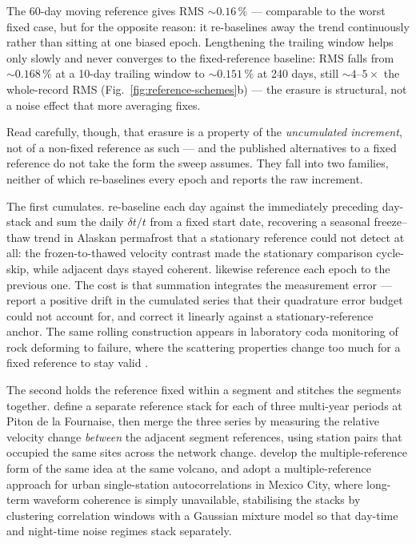 \documentclass[
  referee]{gji}
\begin{document}
The 60-day moving reference gives RMS \(\sim\!0.16\,\%\) --- comparable
to the worst fixed case, but for the opposite reason: it re-baselines
away the trend continuously rather than sitting at one biased epoch.
Lengthening the trailing window helps only slowly and never converges to
the fixed-reference baseline: RMS falls from \(\sim\!0.168\,\%\) at a
10-day trailing window to \(\sim\!0.151\,\%\) at 240 days, still
\(\sim\!4\)--\(5\times\) the whole-record RMS
(Fig.~\ref{fig:reference-schemes}b) --- the erasure is structural, not a
noise effect that more averaging fixes.

Read carefully, though, that erasure is a property of the
\emph{uncumulated
increment}, not of a non-fixed reference as such --- and the published
alternatives to a fixed reference do not take the form the sweep
assumes. They fall into two families, neither of which re-baselines
every epoch and reports the raw increment.

The first cumulates. \citet{James2017} re-baseline each day against the
immediately preceding day-stack and sum the daily \(\delta t/t\) from a
fixed start date, recovering a seasonal freeze--thaw trend in Alaskan
permafrost that a stationary reference could not detect at all: the
frozen-to-thawed velocity contrast made the stationary comparison
cycle-skip, while adjacent days stayed coherent. \citet{Rivet2011}
likewise reference each epoch to the previous one. The cost is that
summation integrates the measurement error --- \citet{James2017} report
a positive drift in the cumulated series that their quadrature error
budget could not account for, and correct it linearly against a
stationary-reference anchor. The same rolling construction appears in
laboratory coda monitoring of rock deforming to failure, where the
scattering properties change too much for a fixed reference to stay
valid \citep{ZotzWilson2019}.

The second holds the reference fixed within a segment and stitches the
segments together. \citet{Rivet2014} define a separate reference stack
for each of three multi-year periods at Piton de la Fournaise, then
merge the three series by measuring the relative velocity change
\emph{between} the adjacent segment references, using station pairs that
occupied the same sites across the network change.
\citet{SensSchonfelder2014} develop the multiple-reference form of the
same idea at the same volcano, and \citet{Ermert2023} adopt a
multiple-reference approach for urban single-station autocorrelations in
Mexico City, where long-term waveform coherence is simply unavailable,
stabilising the stacks by clustering correlation windows with a Gaussian
mixture model so that day-time and night-time noise regimes stack
separately.
\end{document}
